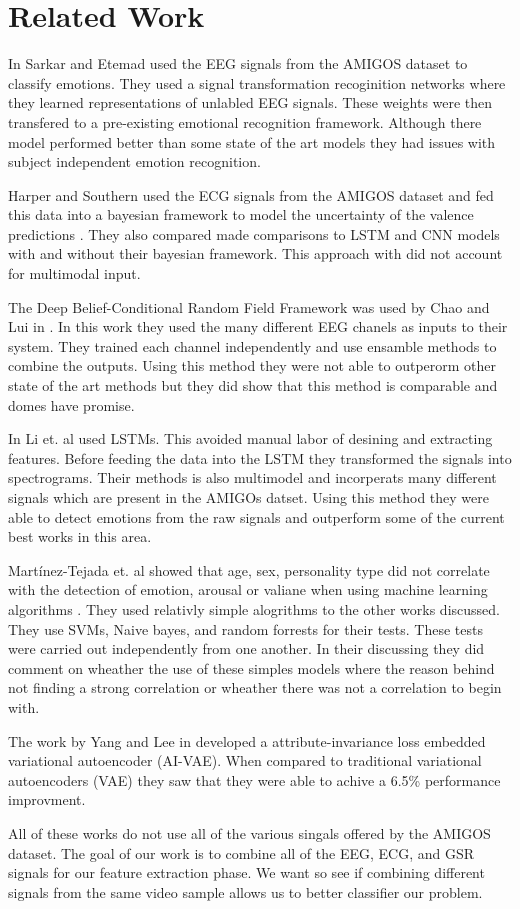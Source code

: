 \section{Related Work}
\label{sec:related_work}
In \cite{sarkar2020selfsupervised} Sarkar and Etemad
used the EEG signals from the AMIGOS dataset to classify emotions.
They used a signal transformation recoginition networks
where they learned representations of unlabled EEG signals.
These weights were then transfered to a pre-existing emotional
recognition framework.
Although there model performed better than some state of the art models
they had issues with subject independent emotion recognition.

Harper and Southern used the ECG signals from the AMIGOS dataset
and fed this data into a bayesian framework to model
the uncertainty of the valence predictions \cite{Harper_2020}.
They also compared made comparisons to LSTM and CNN models with
and without their bayesian framework.
This approach with did not account for multimodal input.

The Deep Belief-Conditional Random Field Framework was used by
Chao and Lui in \cite{8999626}.
In this work they used the many different EEG chanels as inputs to their system.
They trained each channel independently and use ensamble methods to combine the outputs.
Using this method they were not able to outperorm other state of the art methods
but they did show that this method is comparable and domes have promise.

In \cite{LI2020102185} Li et. al used LSTMs.
This avoided manual labor of desining and extracting features.
Before feeding the data into the LSTM they transformed the signals into spectrograms.
Their methods is also multimodel and incorperats many different signals which
are present in the AMIGOs datset.
Using this method they were able to detect emotions from the raw signals and outperform some of the current best works in this area.


Martínez-Tejada et. al showed that age, sex, personality type did not
correlate with the detection of emotion, arousal or valiane when using
machine learning algorithms \cite{Mart_nez_Tejada_2020}.
They used relativly simple alogrithms to the other works discussed.
They use SVMs, Naive bayes, and random forrests for their tests.
These tests were carried out independently from one another.
In their discussing they did comment on wheather the use of these
simples models where the reason behind not finding a strong correlation
or wheather there was not a correlation to begin with.

The work by Yang and Lee in \cite{8683290}  developed
a attribute-invariance loss embedded variational autoencoder (AI-VAE).
When compared to traditional variational autoencoders (VAE)
they saw that they were able to achive a 6.5\% performance improvment.

All of these works do not use all of the various singals offered by the AMIGOS dataset.
The goal of our work is to combine all of the EEG, ECG, and GSR signals for our feature extraction phase.
We want so see if combining different signals from the same video sample
allows us to better classifier our problem.

